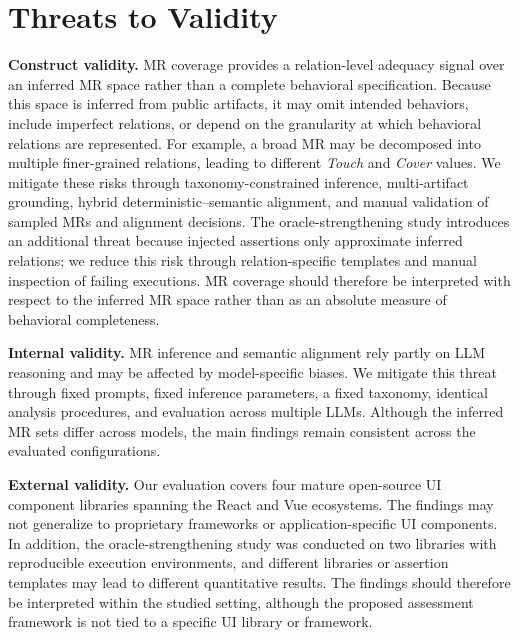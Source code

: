 \section{Threats to Validity}\label{sec:threats_to_validity}

\noindent\textbf{Construct validity.}
MR coverage provides a relation-level adequacy signal over an inferred MR space rather than a complete behavioral specification. Because this space is inferred from public artifacts, it may omit intended behaviors, include imperfect relations, or depend on the granularity at which behavioral relations are represented. For example, a broad MR may be decomposed into multiple finer-grained relations, leading to different \textit{Touch} and \textit{Cover} values. We mitigate these risks through taxonomy-constrained inference, multi-artifact grounding, hybrid deterministic--semantic alignment, and manual validation of sampled MRs and alignment decisions. The oracle-strengthening study introduces an additional threat because injected assertions only approximate inferred relations; we reduce this risk through relation-specific templates and manual inspection of failing executions. MR coverage should therefore be interpreted with respect to the inferred MR space rather than as an absolute measure of behavioral completeness.

\vspace{4pt}
\noindent\textbf{Internal validity.}
MR inference and semantic alignment rely partly on LLM reasoning and may be affected by model-specific biases. We mitigate this threat through fixed prompts, fixed inference parameters, a fixed taxonomy, identical analysis procedures, and evaluation across multiple LLMs. Although the inferred MR sets differ across models, the main findings remain consistent across the evaluated configurations.

\vspace{4pt}
\noindent\textbf{External validity.}
Our evaluation covers four mature open-source UI component libraries spanning the React and Vue ecosystems. The findings may not generalize to proprietary frameworks or application-specific UI components. In addition, the oracle-strengthening study was conducted on two libraries with reproducible execution environments, and different libraries or assertion templates may lead to different quantitative results. The findings should therefore be interpreted within the studied setting, although the proposed assessment framework is not tied to a specific UI library or framework.